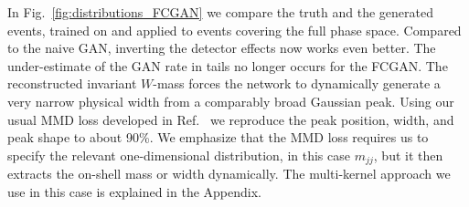 In Fig.~\ref{fig:distributions_FCGAN} we compare the truth and the
generated events, trained on and applied to events covering the full
phase space. Compared to the naive GAN, inverting the detector effects
now works even better. The under-estimate of the GAN rate in tails no longer 
occurs for the FCGAN.  The reconstructed invariant
$W$-mass forces the network to dynamically generate a very narrow
physical width from a comparably broad Gaussian peak. Using our usual
MMD loss developed in Ref.~\cite{gan_phasespace} we reproduce the peak
position, width, and peak shape to about 90\%. We emphasize that
the MMD loss requires us to specify the relevant one-dimensional
distribution, in this case $m_{jj}$, but it then extracts the on-shell
mass or width dynamically. The multi-kernel approach we use in this
case is explained in the Appendix.

